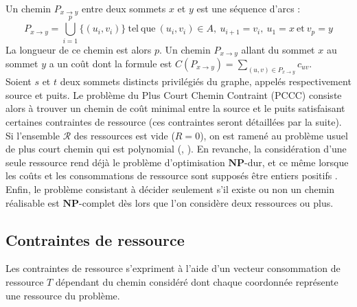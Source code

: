 \documentclass[10pt,francais]{llncs}
\begin{document}
Un chemin $P_{x \to y}$ entre deux sommets $x$ et $y$ est une s\'equence d'arcs : 
$$\displaystyle P_{x \to y} = \bigcup_{i=1}^{p}\{(u_i,v_i)\}\ \mathrm{tel\ que}\ (u_i,v_i) \in A,\ u_{i+1} = v_i,\ u_1 = x\ \mathrm{et}\ v_p = y$$
La longueur de ce chemin est alors $p$. Un chemin $P_{x \to y}$ allant du sommet $x$ au sommet $y$ a un co\^ut dont la formule est $\displaystyle C(P_{x \to y}) = \sum_{(u,v) \in P_{x \to y}} c_{uv}$.\\
Soient $s$ et $t$ deux sommets distincts privil\'egi\'es du graphe, appel\'es respectivement source et puits. Le probl\`eme du Plus Court Chemin Contraint (PCCC) consiste alors \`a trouver un chemin de co\^ut minimal entre la source et le puits satisfaisant certaines contraintes de ressource (ces contraintes seront d\'etaill\'ees par la suite). Si l'ensemble $\mathscr{R}$ des ressources est vide ($R=0$), on est ramen\'e au probl\`eme usuel de plus court chemin qui est polynomial (\cite{Bellman1958}, \cite{Dijkstra1959}). En revanche, la consid\'eration d'une seule ressource rend d\'ej\`a le probl\`eme d'optimisation $\mathbf{NP}$-dur, et ce m\^eme lorsque les co\^uts et les consommations de ressource sont suppos\'es \^{e}tre entiers positifs \cite{Garey1979} \cite{Dror1994}. Enfin, le probl\`eme consistant \`a d\'ecider seulement s'il existe ou non un chemin r\'ealisable est $\mathbf{NP}$-complet d\`es lors que l'on consid\`ere deux ressources ou plus.

\subsection{Contraintes de ressource}\label{sub-desc-contrainte}
Les contraintes de ressource s'expriment \`a l'aide d'un vecteur consommation de ressource $T$ d\'ependant du chemin consid\'er\'e dont chaque coordonn\'ee repr\'esente une ressource du probl\`eme.
\end{document}
